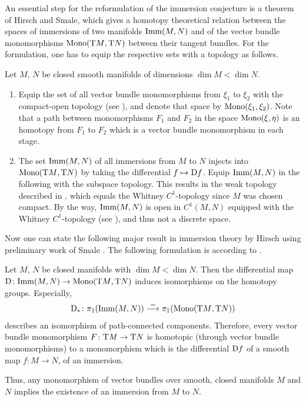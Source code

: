 An essential step for the reformulation of the immersion conjecture is
a theorem of Hirsch and Smale, which gives a homotopy theoretical
relation between the spaces of immersions of two manifolds $\mathrm{Imm}({M},{N})$
and of the vector bundle monomorphisms $\mathrm{Mono}({\mathrm{T}M},{\mathrm{T}N})$ between
their tangent bundles. For the formulation, one has to equip the
respective sets with a topology as follows.
\begin{Def}
  Let $M$, $N$ be closed smooth manifolds of dimensions $\dim M<\dim N$.
  \begin{enumerate}
  \item
    Equip the set of all vector bundle monomorphisms from $\xi_1$ to
    $\xi_2$ with the compact-open topology (see \forexample
    \cite{hatcher}), and denote that space by $\mathrm{Mono}({\xi_1},{\xi_2})$.
    Note that a path between monomorphisms $F_1$ and $F_2$ in the
    space $\mathrm{Mono}({\xi},{\eta})$ is an homotopy from $F_1$ to $F_2$ which is
    a vector bundle monomorphism in each stage.
  \item
    The set $\mathrm{Imm}({M},{N})$ of all immersions from $M$ to $N$ injects
    into $\mathrm{Mono}({\mathrm{T}M},{\mathrm{T}N})$ by taking the differential
    $f\mapsto\mathrm{D} f$.
    Equip $\mathrm{Imm}({M},{N})$ in the following with the subspace topology.
    This results in the weak topology described in
    \cite[Section~2.1]{hirsch}, which equals the Whitney
    $C^1$-topology since $M$ was chosen compact.
    By the way, $\mathrm{Imm}({M},{N})$ is open in $C^1(M,N)$ equipped with the
    Whitney $C^1$-topology
    (see \cite[Section~2.1, Theorem~1.1]{hirsch}),
    and thus not a discrete space.
  \end{enumerate}
\end{Def}

Now one can state the following major result in immersion theory by
Hirsch using preliminary work of Smale
\cite[Sections~5 and 6]{hirschimmersions}. The following formulation
is according to
\cite[Theorem~1.2]{immersionconj}. %
\begin{Thm}\label{thm:hirschsmale}
  Let $M$, $N$ be closed manifolds with $\dim M<\dim N$.
  Then the differential map
  $\mathrm{D}\colon \mathrm{Imm}({M},{N})\to \mathrm{Mono}({\mathrm{T}M},{\mathrm{T}N})$
  induces isomorphisms on the homotopy groups.
  Especially,
  \begin{gather*}
    \mathrm{D}_*\colon
    \pi_1(\mathrm{Imm}({M},{N})) \overset\sim{\longrightarrow} \pi_1(\mathrm{Mono}({\mathrm{T}M},{\mathrm{T}N}))
  \end{gather*}
  describes an isomorphism of path-connected components.
  Therefore, every vector bundle monomorphism
  $F\colon\mathrm{T}M\to\mathrm{T}N$ is homotopic (through vector bundle
  monomorphisms) to a monomorphism which is the differential
  $\mathrm{D} f$ of a smooth map $f\colon M\to N$, \idest of an
  immersion.
\end{Thm}
Thus, any monomorphism of vector bundles over smooth, closed
manifolds $M$ and $N$ implies the existence of an immersion from $M$
to $N$.

